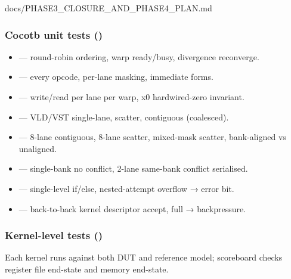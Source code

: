 \begin{relocated}{docs/PHASE3_CLOSURE_AND_PHASE4_PLAN.md}
\subsubsection{\texorpdfstring{Cocotb unit tests
()}{Cocotb unit tests ()}}\label{ds:ch:phase3-closure-phase4-plan:62-cocotb-unit-tests-tbcocotbgpu}

\begin{itemize}
\tightlist
\item
   --- round-robin ordering, warp
  ready/\allowbreak{}busy, divergence reconverge.
\item
   --- every opcode, per-lane masking,
  immediate forms.
\item
   --- write/\allowbreak{}read per lane per
  warp, x0 hardwired-zero invariant.
\item
   --- VLD/VST single-lane, scatter,
  contiguous (coalesced).
\item
   --- 8-lane contiguous, 8-lane scatter,
  mixed-mask scatter, bank-aligned vs unaligned.
\item
   --- single-bank no conflict, 2-lane
  same-bank conflict serialised.
\item
   --- single-level if/else, nested-attempt
  overflow → error bit.
\item
   --- back-to-back kernel descriptor
  accept, full → backpressure.
\end{itemize}

\subsubsection{\texorpdfstring{Kernel-level tests
()}{Kernel-level tests ()}}\label{ds:ch:phase3-closure-phase4-plan:63-kernel-level-tests-tbcocotbgpukernels}

Each kernel runs against both DUT and reference model; scoreboard checks
register file end-state and memory end-state.


\end{relocated}
